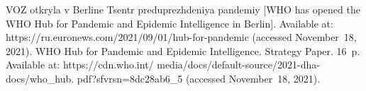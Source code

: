   \begin{multicols}{2}

\renewcommand{\bibname}{\protect\rmfamily References}

{\small\frenchspacing
 {\baselineskip=10.65pt
 \begin{thebibliography}{99}
 
 \vspace*{-3pt}

 VOZ otkryla v Berline \mbox{Tsentr} pre\-du\-prezh\-de\-niya pandemiy [WHO has opened 
the WHO Hub for Pandemic and Epidemic Intelligence in Berlin]. Available at: {\sf 
https://ru.euronews.com/2021/09/01/hub-for-\linebreak pandemic} (accessed November~18, 2021).
WHO Hub for Pandemic and Epidemic Intelligence. Strategy Paper. 16~p. Available at: {\sf 
https://cdn.who.int/\linebreak
 media/docs/default-source/2021-dha-docs/who\_hub. pdf?sfvrsn=8dc28ab6\_5} 
(accessed November~18, 2021).

\columnbreak


\end{thebibliography}}}
\end{multicols}
